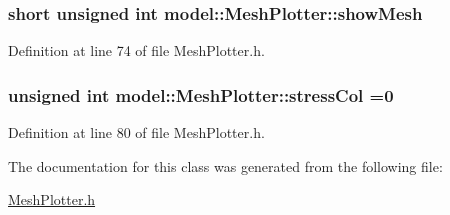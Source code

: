 \subsubsection[{show\+Mesh}]{\setlength{\rightskip}{0pt plus 5cm}short unsigned int model\+::\+Mesh\+Plotter\+::show\+Mesh}\label{classmodel_1_1_mesh_plotter_a7166e825bfb9a386429d2d38f0587904}


Definition at line 74 of file Mesh\+Plotter.\+h.

\hypertarget{classmodel_1_1_mesh_plotter_ac9e6c8695ff72eb2fccab3da7bb6daf0}{}
\subsubsection[{stress\+Col}]{\setlength{\rightskip}{0pt plus 5cm}unsigned int model\+::\+Mesh\+Plotter\+::stress\+Col =0\hspace{0.3cm}{\ttfamily [static]}}\label{classmodel_1_1_mesh_plotter_ac9e6c8695ff72eb2fccab3da7bb6daf0}


Definition at line 80 of file Mesh\+Plotter.\+h.



The documentation for this class was generated from the following file\+:\begin{DoxyCompactItemize}
\item 
\hyperlink{_mesh_plotter_8h}{Mesh\+Plotter.\+h}\end{DoxyCompactItemize}
